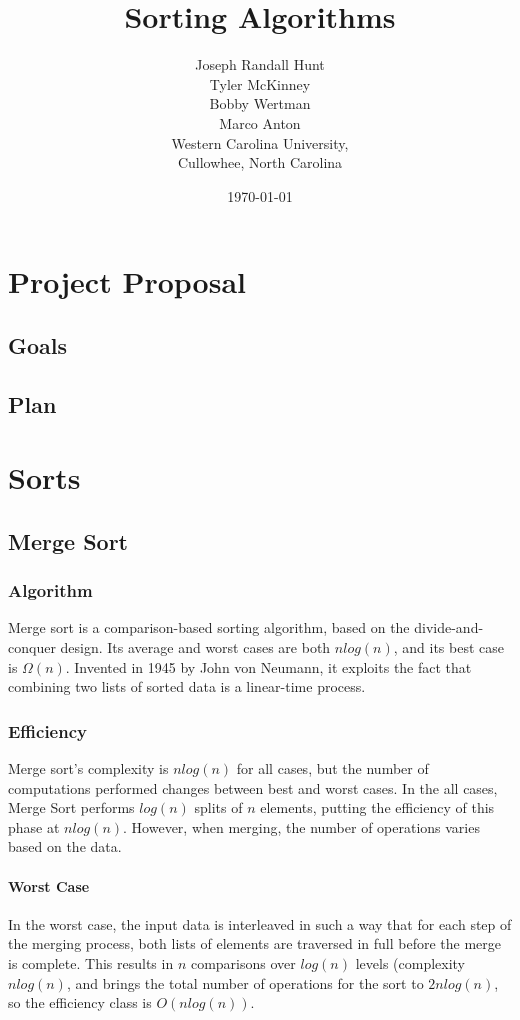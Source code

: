 \documentclass{article}
\title{Sorting Algorithms}
\author{Joseph Randall Hunt\\
Tyler McKinney\\
Bobby Wertman\\
Marco Anton\\
Western Carolina University,\\
Cullowhee, North Carolina\\
}
\date{\today}
\begin{document}
\maketitle
\section{Project Proposal}
   \subsection{Goals}
   \subsection{Plan}
\section{Sorts}
   \subsection{Merge Sort}
      \subsubsection{Algorithm}
        Merge sort is a comparison-based sorting algorithm, based on the
        divide-and-conquer design.  Its average and worst cases are both $n
        log(n)$, and its best case is $\Omega(n)$.  Invented in 1945 by John
        von Neumann, it exploits the fact that combining two lists of sorted
        data is a linear-time process.  \cite{introalg}
      \subsubsection{Efficiency}
        Merge sort's complexity is $n log(n)$ for all cases, but the number of
        computations performed changes between best and worst cases.  In the
        all cases, Merge Sort performs $log(n)$ splits of $n$ elements, putting
        the efficiency of this phase at $n log(n)$.  However, when merging, the
        number of operations varies based on the data.
        \paragraph{Worst Case}
          In the worst case, the input data is interleaved in such a way that
          for each step of the merging process, both lists of elements are
          traversed in full before the merge is complete.  This results in $n$
          comparisons over $log(n)$ levels (complexity $n log(n)$, and brings
          the total number of operations for the sort to $2n log(n)$, so the
          efficiency class is $O(n log(n))$.
\end{document}
